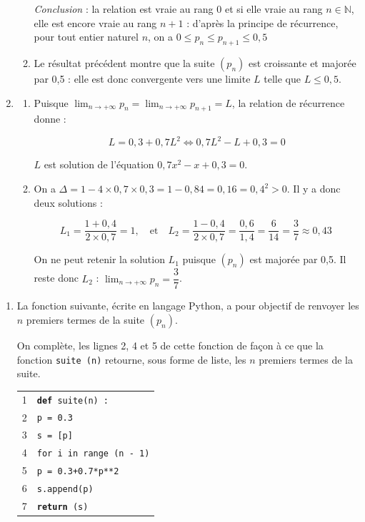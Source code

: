 \documentclass[10pt]{article}
\providecommand{\blue}{\color{blue}}
\providecommand{\N}{\mathbb{N}}
\providecommand{\np}[2][]{{#2~#1}}
\providecommand{\blue}{\color{blue}}
\begin{document}
\begin{enumerate}
\begin{enumerate}
\emph{Conclusion} : la relation est vraie au rang 0 et si elle vraie au rang $n \in \N$, elle est encore vraie au rang $n + 1$ : d'après la principe de récurrence, pour tout entier naturel $n$, on a  $0 \leqslant p_n \leqslant p_{n+1} \leqslant0,5$
		\item 
Le résultat précédent montre que la suite $\left(p_n\right)$ est croissante et majorée par 0,5 : elle est donc convergente vers une limite $L$ telle que $L \leqslant 0,5$.
	\end{enumerate}
\item 
	\begin{enumerate}
		\item 
		

Puisque $\displaystyle\lim_{n \to + \infty} p_n = \displaystyle\lim_{n \to + \infty} p_{n+1} = L$, la relation de récurrence donne :

\[L = 0,3 + 0,7L^2 \iff 0,7L^2 - L + 0,3 = 0\]

$L$ est solution de l'équation $0,7x^2 - x  + 0,3 = 0$.
		\item 
		On a $\Delta = 1 - 4 \times 0,7 \times 0,3 = 1 - 0,84 = 0,16 = 0,4^2 > 0$. Il y a donc deux solutions :
		
\[L_1 = \dfrac{1 + 0,4}{2\times 0,7} = 1, \quad \text{et}\quad L_2 = \dfrac{1 - 0,4}{2\times 0,7} = \frac{0,6}{1,4} = \dfrac{6}{14} = \dfrac37 \approx \np{0,43}\]
		
On ne peut retenir la solution $L_1$ puisque $\left(p_n\right)$ est majorée par 0,5. Il reste donc $L_2$ : 
$\displaystyle\lim_{n \to + \infty} p_n = \dfrac37$.
	\end{enumerate}
\end{enumerate}

\begin{enumerate}[resume]
\item La fonction suivante, écrite en langage Python, a pour objectif de renvoyer les $n$ premiers termes de la suite $\left(p_n\right)$.

On complète, les lignes 2, 4 et 5 de cette fonction de façon à ce que la fonction \texttt{suite (n)} retourne, sous forme de liste, les $n$ premiers termes de la suite.

\begin{center}
\begin{tabularx}{0.4\linewidth}{c |l|}\cline{2-2}
1 &\texttt{\textbf{def} suite(n) :}\\
2 &\quad \texttt{p = {\blue 0.3}}\\
3 &\quad \texttt{s = [p]}\\
4 &\quad \texttt{for i in range ({\blue n - 1})}\\
5 &\quad \qquad \texttt{p = {\blue 0.3+0.7*p**2}}\\
6 &\quad \qquad \texttt{s.append(p)}\\
7 &\quad \texttt{\textbf{return} (s)}\\ \cline{2-2}
\end{tabularx}
\end{center}


\end{enumerate}
\end{document}
